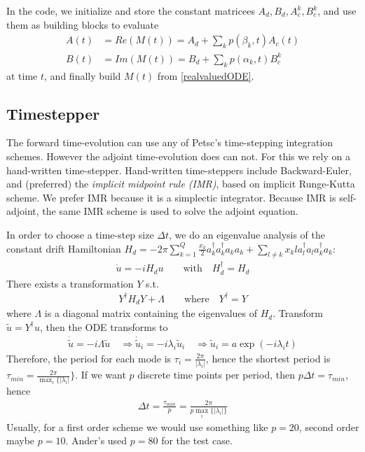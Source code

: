 \documentclass[letterpaper]{article}
\begin{document}
   In the code, we initialize and store the constant matricees $A_d,B_d,A_c^k,  B_c^k$, and use them as building blocks to evaluate 
   \begin{align}
     A(t) &= Re(M(t)) = A_d + \sum_kp(\beta_k, t)A_c(t) \\
     B(t) &= Im(M(t)) = B_d + \sum_k p(\alpha_k, t)B_c^k
   \end{align}
   at time $t$, and finally build $M(t)$ from \eqref{realvaluedODE}.
  \subsection{Timestepper}
    The forward time-evolution can use any of Petsc's time-stepping integration schemes. However the adjoint time-evolution does can not. For this we rely on a hand-written time-stepper. Hand-written time-steppers include Backward-Euler, and (preferred) the \textit{implicit midpoint rule (IMR)}, based on implicit Runge-Kutta scheme. We prefer IMR because it is a simplectic integrator. Because IMR is self-adjoint, the same IMR scheme is used to solve the adjoint equation. 

    In order to choose a time-step size $\Delta t$, we do an eigenvalue analysis of the constant drift Hamiltonian $H_d =  -2\pi \sum_{k=1}^Q \frac{x_k}{2} a_k^{\dagger}a_k^{\dagger}a_ka_k + \sum_{l\neq k} x_kl a_l^{\dagger}a_l a_k^{\dagger}a_k$:
       \begin{align*}  
         \dot u = -i H_d u \qquad \text{with} \quad H_d^{\dagger}  = H_d
       \end{align*} 
       There exists a transformation $Y$ s.t. 
       \begin{align*}
         Y^{\dagger}H_d Y + \Lambda \qquad  \text{where} \quad Y^{\dagger} = Y
       \end{align*}
       where $\Lambda$ is a diagonal matrix containing the eigenvalues of $H_d$. Transform $\tilde u = Y^{\dagger} u$, then the ODE transforms to 
       \begin{align*}
         \dot \tilde u = -i \Lambda \tilde u \quad \Rightarrow \dot \tilde u_i = -i\lambda_i \tilde u_i \quad \Rightarrow \tilde u_i = a \exp(-i\lambda_i t)
       \end{align*}
       Therefore, the period for each mode is $\tau_i = \frac{2\pi}{|\lambda_i|}$, hence the shortest period is $\tau_{min} = \frac{2\pi}{\max_i\{|\lambda_i|}\}$. If we want $p$ discrete time points per period, then $p\Delta t = \tau_{min}$, hence 
       \begin{align*}
         \Delta t = \frac{\tau_{min}}{p} = \frac{2\pi}{p\max_i\{|\lambda_i|\}}
       \end{align*}
       Usually, for a first order scheme we would use something like $p=20$, second order maybe $p=10$. Ander's used $p=80$ for the test case. 
\end{document}
